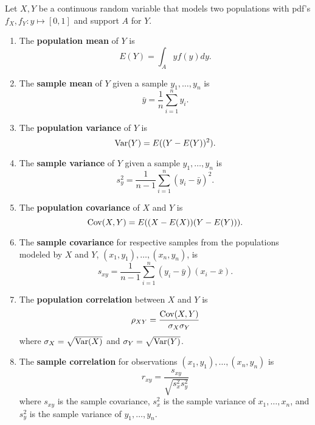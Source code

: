 \documentclass[11pt,fleqn]{book} %
\begin{document}
\begin{definition} \label{def:111}
Let \(X, Y\) be a continuous random variable that models two populations with pdf's \(f_X, f_Y:y\mapsto[0, 1]\) and support \(A\) for \(Y\).
\begin{enumerate}
\item The \textbf{population mean} of \(Y\) is
\[
E(Y) = \int_A yf(y)dy.
\]
\item The \textbf{sample mean} of \(Y\) given a sample \(y_1, \ldots, y_n\) is
\[
\bar{y} = \frac1n\sum_{i=1}^n y_i.
\]
\item The \textbf{population variance} of \(Y\) is
\[
\operatorname{Var}(Y) = E((Y - E(Y))^2).
\]
\item The \textbf{sample variance} of \(Y\) given a sample \(y_1, \ldots, y_n\) is
\[
s_y^2 = \frac{1}{n - 1}\sum_{i=1}^n(y_i - \bar{y})^2.
\]
\item The \textbf{population covariance} of \(X\) and \(Y\) is
\[
\operatorname{Cov}(X, Y) = E((X - E(X))(Y - E(Y))).
\]
\item The \textbf{sample covariance} for respective samples from the populations modeled by \(X\) and \(Y\), \((x_1, y_1), \ldots, (x_n, y_n)\), is
\[
s_{xy} = \frac{1}{n - 1}\sum_{i=1}^n(y_i - \bar{y})(x_i - \bar{x}).
\]
\item The \textbf{population correlation} between \(X\) and \(Y\) is
\[
\rho_{XY} = \frac{\operatorname{Cov}(X, Y)}{\sigma_X\sigma_Y}
\]
where \(\sigma_X = \sqrt{\operatorname{Var}(X)}\) and \(\sigma_Y = \sqrt{\operatorname{Var}(Y)}\).
\item The \textbf{sample correlation} for observations \((x_1, y_1), \ldots, (x_n, y_n)\) is
\[
r_{xy} = \frac{s_{xy}}{\sqrt{s^2_x s^2_y}}
\]
where \(s_{xy}\) is the sample covariance, \(s^2_x\) is the sample variance of \(x_1, \ldots, x_n\), and \(s^2_y\) is the sample variance of \(y_1, \ldots, y_n\).
\end{enumerate}
\end{definition}
\end{document}
